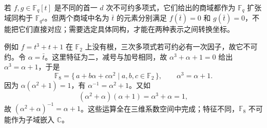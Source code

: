 \ProseParagraphBreak
若 \(f,g\in\mathbb F_q[t]\) 是不同的首一 \(d\) 次不可约多项式，它们给出的商域都作为 \(\mathbb F_q\) 扩张域同构于 \(\mathbb F_{q^d}\)。但两个商域中名为 \(\bar t\) 的元素分别满足 \(f(\bar t)=0\) 和 \(g(\bar t)=0\)，不能把它们直接对应；需要选定具体同构，才能在两种表示之间转换坐标。

\ProseParagraphBreak
例如 \(f=t^3+t+1\) 在 \(\mathbb F_2\) 上没有根，三次多项式若可约必有一次因子，故它不可约。令 \(\alpha=\bar t\)。这里特征为二，减号与加号相同，故 \(\alpha^3+\alpha+1=0\) 给出 \(\alpha^3=\alpha+1\)，于是
\[
	\mathbb F_8=\{\,a+b\alpha+c\alpha^2\mid a,b,c\in\mathbb F_2\,\}, \qquad \alpha^3=\alpha+1.
\]
因为 \(\alpha(\alpha^2+1)=1\)，有 \(\alpha^{-1}=\alpha^2+1\)。又如
\[
	(\alpha^2+\alpha)(\alpha+1)=\alpha^3+\alpha=1,
\]
故 \((\alpha^2+\alpha)^{-1}=\alpha+1\)。这些运算全在三维系数空间中完成；特征不同，\(\mathbb F_8\) 不可能作为子域嵌入 \(\mathbb C\)。
